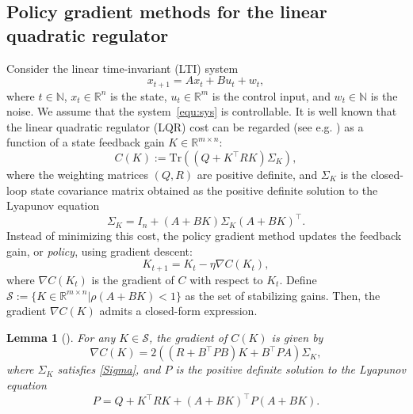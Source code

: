 \documentclass[letterpaper, 10 pt, conference]{ieeeconf}  %
\newtheorem{lemma}{Lemma}
\begin{document}
\subsection{Policy gradient methods for the linear quadratic regulator}
Consider the linear time-invariant (LTI) system  
\begin{equation}\label{equ:sys}
x_{t+1} = A x_t + B u_t + w_t,
\end{equation}
where $t\in \mathbb{N}$, $x_t\in\mathbb{R}^{n}$ is the state, $u_t\in\mathbb{R}^{m}$ is the control input, and $w_t\in \mathbb{N}$ is the noise. We assume that the system~\eqref{equ:sys} is controllable. It is well known that the linear quadratic regulator (LQR) cost can be regarded (see e.g. \cite{fazel2018global}) as a function of a state feedback gain $K\in \mathbb{R}^{m\times n}$: 
\begin{equation}
    C(K) := \mathrm{Tr} \left( (Q + K^\top R K) \Sigma_K \right),
\end{equation}
where the weighting matrices $(Q, R)$ are positive definite, and \( \Sigma_K \) is the closed-loop state covariance matrix obtained as the positive definite solution to the Lyapunov equation
\begin{equation}
\label{Sigma}
\Sigma_K = I_n + (A + BK) \Sigma_K (A + BK)^\top.
\end{equation} 
Instead of minimizing this cost, the policy gradient method updates the feedback gain, or \textit{policy}, using gradient descent:
 \begin{equation}\label{equ:grad}
 	 	K_{t+1} = K_t - \eta \nabla C(K_t),
 	 \end{equation}
     where $\nabla C(K_t)$ is the gradient of $C$ with respect to $K_t$. Define $\mathcal{S}:=\{K\in \mathbb{R}^{m\times n}|\rho(A+BK)<1\}$ as the set of stabilizing gains. Then, the gradient $\nabla C(K)$ admits a closed-form expression.
 	 \begin{lemma}[{\cite[Lemma 1]{fazel2018global}}]\label{lem:mb_pg}
 	 	For any $K\in\mathcal{S}$, the gradient of $C(K)$ is given by
 	 	\begin{equation}\label{equ:gradK}
 	 		\nabla C(K) =  2\left(\left(R+{B}^{\top} P {B}\right) K+{B}^{\top} P {A}\right) {\Sigma_K},
 	 	\end{equation} 
 	 	where ${\Sigma_K}$ satisfies \eqref{Sigma}, and $P$ is the positive definite solution to the Lyapunov equation 
 	 	\begin{equation}\label{equ:Lyap}
 	 		P = Q + K^{\top}RK + ({A}+{B}K)^{\top}P ({A}+{B}K).
 	 	\end{equation}
 	 \end{lemma}
\end{document}
